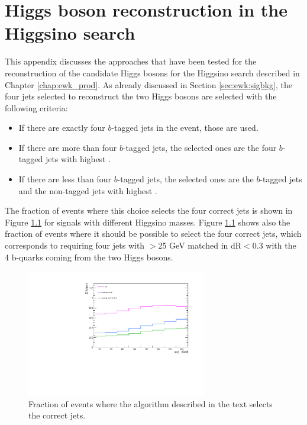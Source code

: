 \chapter{Higgs boson reconstruction in the Higgsino search}
\label{app:higgs}

This appendix discusses the approaches that have been tested for the reconstruction of the 
candidate Higgs bosons for the Higgsino search described in Chapter \ref{chap:ewk_prod}.
As already discussed in Section \ref{sec:ewk:sigbkg}, the four jets selected to reconstruct the two Higgs bosons 
are selected with the following criteria:

\begin{itemize}
\item If there are exactly four $b$-tagged jets in the event, those are used.
\item If there are more than four $b$-tagged jets, the selected ones are the four $b$-tagged jets with highest \pt.
\item If there are less than four $b$-tagged jets, the selected ones are the $b$-tagged jets and the non-tagged jets with highest \pt.
\end{itemize}

The fraction of events where this choice selects the four correct jets is shown in Figure \ref{fig:h_reco_match_possible} 
for signals with different Higgsino masses. 
Figure \ref{fig:h_reco_match_possible} shows also the fraction of events where it should be possible to select the four correct jets, 
which corresponds to requiring four jets with \pt $>$25 GeV  matched in dR$<$0.3 with the 4 b-quarks coming from the two Higgs bosons.

\begin{figure}[h]
\centering
\includegraphics[width=0.7\textwidth]{figures/h_reco/match_possible.pdf}
\caption{Fraction of events where the algorithm described in the text selects the correct jets.}
\label{fig:h_reco_match_possible}
\end{figure}

